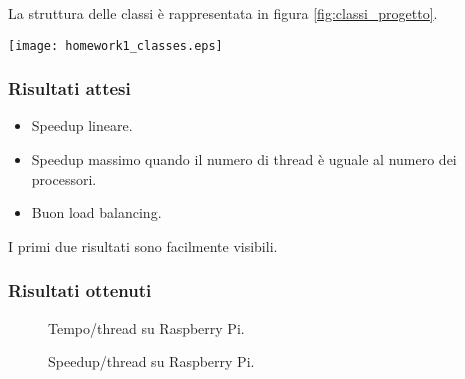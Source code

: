 \documentclass[]{myarticle}
\begin{document}
La struttura delle classi \`e rappresentata in figura \ref{fig:classi_progetto}.

\begin{figure*}[th]
	\centering
	\texttt{[image: homework1\_classes.eps]}
	\caption{Struttura delle classi del progetto.}
	\label{fig:classi_progetto}
\end{figure*}

\subsubsection{Risultati attesi}

\begin{itemize}
	\item Speedup lineare.
	\item Speedup massimo quando il numero di thread \`e uguale al numero dei processori.
	\item Buon load balancing.
\end{itemize}
I primi due risultati sono facilmente visibili.

\subsubsection{Risultati ottenuti}




\begin{figure}[h]
	\caption{Tempo/thread su Raspberry Pi.}
\end{figure}

\begin{figure}[h]
	\caption{Speedup/thread su Raspberry Pi.}
\end{figure}
\end{document}
